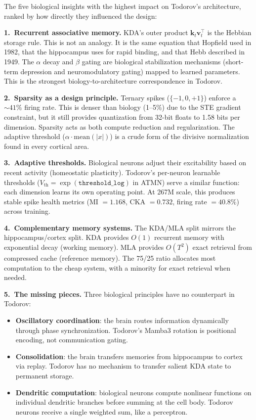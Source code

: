 \documentclass[11pt,a4paper]{article}
\begin{document}
The five biological insights with the highest impact on Todorov's architecture, ranked by how directly they influenced the design:

\textbf{1.\ Recurrent associative memory.} KDA's outer product $\mathbf{k}_t \mathbf{v}_t^\top$ is the Hebbian storage rule. This is not an analogy. It is the same equation that Hopfield used in 1982, that the hippocampus uses for rapid binding, and that Hebb described in 1949. The $\alpha$ decay and $\beta$ gating are biological stabilization mechanisms (short-term depression and neuromodulatory gating) mapped to learned parameters. This is the strongest biology-to-architecture correspondence in Todorov.

\textbf{2.\ Sparsity as a design principle.} Ternary spikes ($\{-1, 0, +1\}$) enforce a ${\sim}41\%$ firing rate. This is denser than biology (1--5\%) due to the STE gradient constraint, but it still provides quantization from 32-bit floats to 1.58 bits per dimension. Sparsity acts as both compute reduction and regularization. The adaptive threshold ($\alpha \cdot \mathrm{mean}(|x|)$) is a crude form of the divisive normalization found in every cortical area.

\textbf{3.\ Adaptive thresholds.} Biological neurons adjust their excitability based on recent activity (homeostatic plasticity). Todorov's per-neuron learnable thresholds ($V_{\mathrm{th}} = \exp(\texttt{threshold\_log})$ in ATMN) serve a similar function: each dimension learns its own operating point. At 267M scale, this produces stable spike health metrics (MI $= 1.168$, CKA $= 0.732$, firing rate $= 40.8\%$) across training.

\textbf{4.\ Complementary memory systems.} The KDA/MLA split mirrors the hippocampus/cortex split. KDA provides $O(1)$ recurrent memory with exponential decay (working memory). MLA provides $O(T^2)$ exact retrieval from compressed cache (reference memory). The 75/25 ratio allocates most computation to the cheap system, with a minority for exact retrieval when needed.

\textbf{5.\ The missing pieces.} Three biological principles have no counterpart in Todorov:
\begin{itemize}
  \item \textbf{Oscillatory coordination}: the brain routes information dynamically through phase synchronization. Todorov's Mamba3 rotation is positional encoding, not communication gating.
  \item \textbf{Consolidation}: the brain transfers memories from hippocampus to cortex via replay. Todorov has no mechanism to transfer salient KDA state to permanent storage.
  \item \textbf{Dendritic computation}: biological neurons compute nonlinear functions on individual dendritic branches before summing at the cell body. Todorov neurons receive a single weighted sum, like a perceptron.
\end{itemize}
\end{document}
